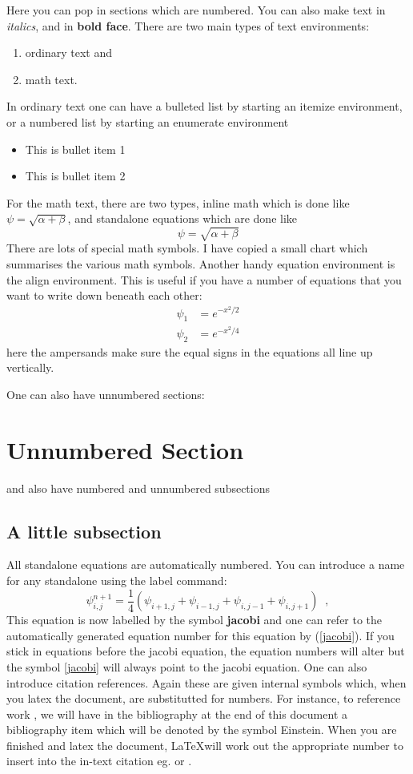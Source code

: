 \documentclass[12pt,a4paper]{article}
\begin{document}
Here you can pop in sections which are numbered. You can also make
text in {\em italics}, and in {\bf bold face}. There are two main
types of text environments:
\begin{enumerate}
\item ordinary text and
\item math text.
\end{enumerate}
In
ordinary text one can have a bulleted list by starting an itemize
environment, or a numbered list by starting an enumerate environment
\begin{itemize}
\item This is bullet item 1
\item This is bullet item 2
\end{itemize}
For the math text, there are two types, inline math which is done like
$\psi=\sqrt{\alpha+\beta}$, and standalone equations which are done
like
\begin{equation}
\psi=\sqrt{\alpha+\beta}
\end{equation}
There are lots of special math symbols. I have copied a small chart
which summarises the various math symbols. Another handy equation
environment is the align environment. This is useful if you
have a number of equations that you want to write down beneath each
other:
\begin{align}
\psi_1&=e^{-x^2/2}\\
\psi_2&=e^{-x^2/4}
\end{align}
here the ampersands make sure the equal signs in the equations all
line up vertically.

One can also have unnumbered sections:
\section*{Unnumbered Section}

and also have numbered and unnumbered subsections
\subsection{A little subsection}

All standalone equations are automatically numbered. You can introduce
a name for any standalone using the label command:
\begin{equation}
\psi_{i,j}^{n+1}=\frac{1}{4}\left( \psi_{i+1,j}+\psi_{i-1,j}+\psi_{i,j-1}+\psi_{i,j+1}\right)\;\;,
\label{jacobi}
\end{equation}
%
This equation is now labelled by the symbol {\bf jacobi} and one can
refer to the automatically generated equation number for this equation
by (\ref{jacobi}). If you stick in equations before the jacobi
equation, the equation numbers will alter but the symbol
\eqref{jacobi} will always point to the jacobi equation. One can also
introduce citation references. Again these are given internal symbols
which, when you latex the document, are substitutted for numbers. For
instance, to reference work \cite{Einstein}, we will have in the
bibliography at the end of this document a bibliography item which
will be denoted by the symbol Einstein. When you are finished and
latex the document, \LaTeX will work out the appropriate number to
insert into the in-text citation eg. \cite{Einstein} or \cite{Bose}.
\end{document}
